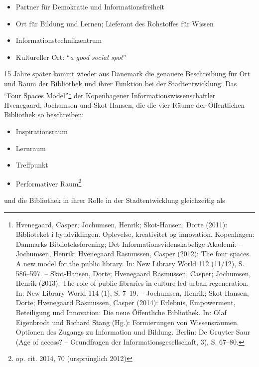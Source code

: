 \begin{flushleft}
\begin{itemize}
\item
  Partner für Demokratie und Informationsfreiheit
\item
  Ort für Bildung und Lernen; Lieferant des Rohstoffes für Wissen
\item
  Informationstechnikzentrum
\item
  Kultureller Ort: \enquote{\emph{a good social spot}}
\end{itemize}
\end{flushleft}

15 Jahre später kommt wieder aus Dänemark die genauere Beschreibung für
Ort und Raum der Bibliothek und ihrer Funktion bei der Stadtentwicklung:
Das \enquote{Four Spaces Model}\footnote{Hvenegaard, Casper; Jochumsen,
  Henrik; Skot-Hansen, Dorte (2011): Biblioteket i byudviklingen.
  Oplevelse, kreativitet og innovation. Kopenhagen: Danmarks
  Biblioteksforening; Det Informationsvidenskabelige Akademi. --
  Jochumsen, Henrik; Hvenegaard Rasmussen, Casper (2012): The four
  spaces. A new model for the public library. In: New Library World 112
  (11/12), S. 586--597. -- Skot-Hansen, Dorte; Hvenegaard Rasmussen,
  Casper; Jochumsen, Henrik (2013): The role of public libraries in
  culture-led urban regeneration. In: New Library World 114 (1), S.
  7--19. -- Jochumsen, Henrik; Skot-Hansen, Dorte; Hvenegaard Rasmussen,
  Casper (2014): Erlebnis, Empowerment, Beteiligung und Innovation: Die
  neue Öffentliche Bibliothek. In: Olaf Eigenbrodt und Richard Stang
  (Hg.): Formierungen von Wissensräumen. Optionen des Zugangs zu
  Information und Bildung. Berlin: De Gruyter Saur (Age of access? --
  Grundfragen der Informationsgesellschaft, 3), S. 67--80.} der
Kopenhagener Informationswissenschaftler Hvenegaard, Jochumsen und
Skot-Hansen, die die vier Räume der Öffentlichen Bibliothek so
beschreiben:

\newpage 

\begin{itemize}
\item
  Inspirationsraum
\item
  Lernraum
\item
  Treffpunkt
\item
  Performativer Raum\footnote{op. cit. 2014, 70 (ursprünglich 2012)}
\end{itemize}

und die Bibliothek in ihrer Rolle in der Stadtentwicklung gleichzeitig
als

